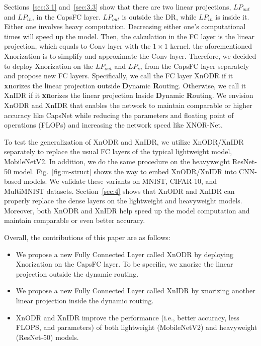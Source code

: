 \documentclass[sn-mathphys,iicol,Numbered]{sn-jnl}
\begin{document}
Sections~\ref{sec:3.1} and~\ref{sec:3.3} show that there are two linear projections, $LP_{out}$ and $LP_{in}$, in the CapsFC layer. $LP_{out}$ is outside the DR, while $LP_{in}$ is inside it. Either one involves heavy computation. Decreasing either one's computational times will speed up the model. Then, the calculation in the FC layer is the linear projection, which equals to Conv layer with the $1\times 1$ kernel. the aforementioned Xnorization is to simplify and approximate the Conv layer. Therefore, we decided to deploy Xnorization on the $LP_{out}$ and $LP_{in}$ from the CapsFC layer separately and propose new FC layers. Specifically, we call the FC layer XnODR if it \textbf{xn}orizes the linear projection \textbf{o}utside \textbf{D}ynamic \textbf{R}outing. Otherwise, we call it XnIDR if it \textbf{xn}orizes the linear projection \textbf{i}nside \textbf{D}ynamic \textbf{R}outing. We envision XnODR and XnIDR that enables the network to maintain comparable or higher accuracy like CapsNet while reducing the parameters and floating point of operations (FLOPs) and increasing the network speed like XNOR-Net.

To test the generalization of XnODR and XnIDR, we utilize XnODR/XnIDR separately to replace the usual FC layers of the typical lightweight model, MobileNetV2. In addition, we do the same procedure on the heavyweight ResNet-50 model. Fig.~\ref{fig:m-struct} shows the way to embed XnODR/XnIDR into CNN-based models. We validate these variants on MNIST, CIFAR-10, and MultiMNIST datasets. Section~\ref{sec:4} shows that XnODR and XnIDR can properly replace the dense layers on the lightweight and heavyweight models. Moreover, both XnODR and XnIDR help speed up the model computation and maintain comparable or even better accuracy.

Overall, the contributions of this paper are as follows:

\begin{itemize}
\item We propose a new Fully Connected Layer called XnODR by deploying Xnorization on the CapsFC layer. To be specific, we xnorize the linear projection outside the dynamic routing.
\item We propose a new Fully Connected Layer called XnIDR by xnorizing another linear projection inside the dynamic routing.
\item XnODR and XnIDR improve the performance (i.e., better accuracy, less FLOPS, and parameters) of both lightweight (MobileNetV2) and heavyweight (ResNet-50) models.
\end{itemize}
\end{document}
